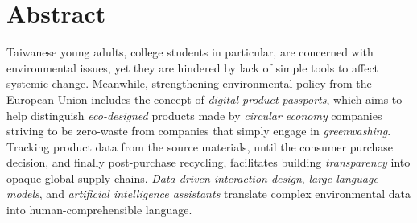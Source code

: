 \documentclass[
  letterpaper,
  DIV=11,
  numbers=noendperiod]{scrartcl}
\author{}
\date{}
\begin{document}
\begin{titlepage}
    \centering
    {\LARGE National Cheng Kung University \\}
    {\LARGE Institute of Creative Industries Design \\}
    {\LARGE Media \& Interaction Design \\}
    {\LARGE Master's Thesis \\}
    \vspace{1in}
    {\LARGE 從消費者到投資者的旅程：\\}
    {\LARGE 設計適合年輕人的金融AI助手，幫助可持續購物、儲蓄及投資\}
    \vspace{0.5in}
    {\LARGE The Journey from Consumer to Investor: \\}
    {\LARGE Designing a Financial AI Companion for Young Adults to Help with \\}
    {\LARGE Sustainable Shopping, Saving, and Investing \\}
    \vspace{1in}
    {\Large Kris Haamer 漢默可 \\}
    \vspace{1in}
    {\Large 指導 教授：仲曉玲 博士 楊佳翰 博士 \\}
    {\Large Advisors: \\}
    {\Large Dr. Hsiao-Ling CHUNG \\}
    {\Large Dr. Chia-Han YANG \\}
    \vfill
    {\Large 113 年 11 月 \\}
    {\Large November 2024 \\}
\end{titlepage}

\newpage
\tableofcontents

\newpage

\section{Abstract}\label{abstract}

Taiwanese young adults, college students in particular, are concerned
with environmental issues, yet they are hindered by lack of simple tools
to affect systemic change. Meanwhile, strengthening environmental policy
from the European Union includes the concept of \emph{digital product
passports}, which aims to help distinguish \emph{eco-designed} products
made by \emph{circular economy} companies striving to be zero-waste from
companies that simply engage in \emph{greenwashing}. Tracking product
data from the source materials, until the consumer purchase decision,
and finally post-purchase recycling, facilitates building
\emph{transparency} into opaque global supply chains. \emph{Data-driven
interaction design}, \emph{large-language models}, and \emph{artificial
intelligence assistants} translate complex environmental data into
human-comprehensible language.
\end{document}
